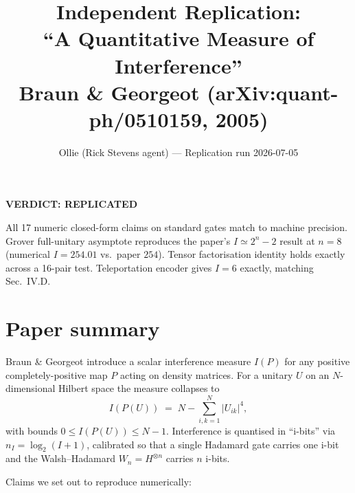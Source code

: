 \documentclass[11pt]{article}
\title{Independent Replication:\\
``A Quantitative Measure of Interference''\\
Braun \& Georgeot (arXiv:quant-ph/0510159, 2005)}
\author{Ollie (Rick Stevens agent) --- Replication run 2026-07-05}
\date{}
\begin{document}
\maketitle

\begin{center}\Large \textbf{VERDICT: REPLICATED}\end{center}

\noindent All 17 numeric closed-form claims on standard gates match to machine
precision. Grover full-unitary asymptote reproduces the paper's
$I \simeq 2^n - 2$ result at $n=8$ (numerical $I = 254.01$ vs.\ paper $254$).
Tensor factorisation identity holds exactly across a 16-pair test.
Teleportation encoder gives $I = 6$ exactly, matching Sec.~IV.D.

\section{Paper summary}

Braun \& Georgeot introduce a scalar interference measure $I(P)$ for any
positive completely-positive map $P$ acting on density matrices. For a unitary
$U$ on an $N$-dimensional Hilbert space the measure collapses to
\begin{equation}
I(P(U)) \;=\; N - \sum_{i,k=1}^{N} |U_{ik}|^4 ,
\label{eq:main}
\end{equation}
with bounds $0 \le I(P(U)) \le N-1$. Interference is quantised in ``i-bits''
via $n_I = \log_2(I+1)$, calibrated so that a single Hadamard gate carries one
i-bit and the Walsh--Hadamard $W_n = H^{\otimes n}$ carries $n$ i-bits.

Claims we set out to reproduce numerically:
\end{document}
